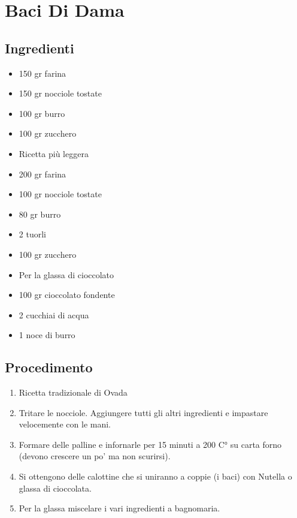 \section{Baci Di Dama}
\subsection{Ingredienti}
\begin{itemize}
\item 150 gr farina  
\item 150 gr nocciole tostate  
\item 100 gr burro  
\item 100 gr zucchero  
\item Ricetta più leggera  
\item 200 gr farina  
\item 100 gr nocciole tostate  
\item 80 gr burro  
\item 2 tuorli  
\item 100 gr zucchero  
\item Per la glassa di cioccolato  
\item 100 gr cioccolato fondente  
\item 2 cucchiai di acqua  
\item 1 noce di burro
\end{itemize}
\subsection{Procedimento}
\begin{enumerate}
\item  Ricetta tradizionale di Ovada  
\item  Tritare le nocciole. Aggiungere tutti gli altri ingredienti e impastare velocemente con le mani.  
\item  Formare delle palline e infornarle per 15 minuti a 200 C° su carta forno (devono crescere un po' ma non scurirsi).  
\item  Si ottengono delle calottine che si uniranno a coppie (i baci) con Nutella o glassa di cioccolata.  
\item  Per la glassa miscelare i vari ingredienti a bagnomaria.
\end{enumerate}
